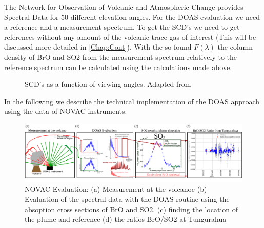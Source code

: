 \documentclass  [
  paper    = a4,
  BCOR     = 10mm,
  twoside,
  fontsize = 12pt,
  fleqn,
  toc      = bibnumbered,
  toc      = listofnumbered,
  numbers  = noendperiod,
  headings = normal,
  listof   = leveldown,
  version  = 3.03
]                                       {scrreprt}
\begin{document}
	The Network for Observation of Volcanic and Atmospheric Change provides Spectral Data for 50 different elevation angles. For the DOAS evaluation we need a reference and a measurement spectrum. To get the SCD's we need to get references without any amount of the volcanic trace gas of interest (This will be discussed more detailed in \cref{Chap:Cont}). With the so found $F\left(\lambda\right)$ the column density of  BrO and SO2 from the measurement spectrum relatively to the reference spectrum can be calculated using the calculations made above. 
	
	\begin{figure}
		\caption{SCD's as a function of viewing angles. Adapted from \cite{WarnachSimon}}
		\label{fig:plumeref}
	\end{figure}
	In the following we describe the technical implementation of the DOAS approach using the data of NOVAC instruments:\\
	\begin{figure}
		\centering
		\includegraphics[width=1\linewidth]{Bilder/NOVAC_Eval}
		\caption{NOVAC Evaluation: (a) Measurement at the volcanoe (b) Evaluation of the spectral data with the DOAS routine using the absoption cross sections of BrO and SO2. (c) finding the location of the plume and reference (d) the ratios BrO/SO2 at Tungurahua }
		\label{fig:NOVAC_Eval}
	\end{figure}
\end{document}
